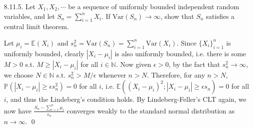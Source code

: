 \begin{exercise}8.11.5. Let $X_1, X_2, \cdots$ be a sequence of uniformly bounded independent random variables, and let $S_n =\sum_{i=1}^n X_i$. If $\text{Var}(S_n)\rightarrow\infty$, show that $S_n$ satisfies a central limit theorem.
\end{exercise}
\begin{answer} Let $\mu_i=\mathbb{E}(X_i)$ and $s_n^2=\text{Var}(S_n)=\sum_{i=1}^n\text{Var}(X_i)$. Since $\{X_i\}_{i=1}^n$ is uniformly bounded, clearly $|X_i-\mu_i|$ is also uniformly bounded, i.e. there is some $M>0$ s.t. $M\geq|X_i-\mu_i|$ for all $i\in\mathbb{N}$. Now given $\epsilon>0$, by the fact that $s_n^2\rightarrow\infty$, we choose $N\in\mathbb{N}$ s.t. $s_n^2> M/\epsilon$ whenever $n>N$. Therefore, for any $n>N$, $\mathbb{P}(|X_i-\mu_i|\geq\epsilon s_n^2)=0$ for all $i$, i.e. $\mathbb{E}((X_i-\mu_i)^2;|X_i-\mu_i|\geq\epsilon s_n)=0$ for all $i$, and thus the Lindeberg's condition holds. By Lindeberg-Feller's CLT again, we now have $\frac{S_n-\sum_{i=1}^n\mu_i}{s_n}$ converges weakly to the standard normal distribution as $n\rightarrow\infty$.
\qed \qquad
\end{answer}